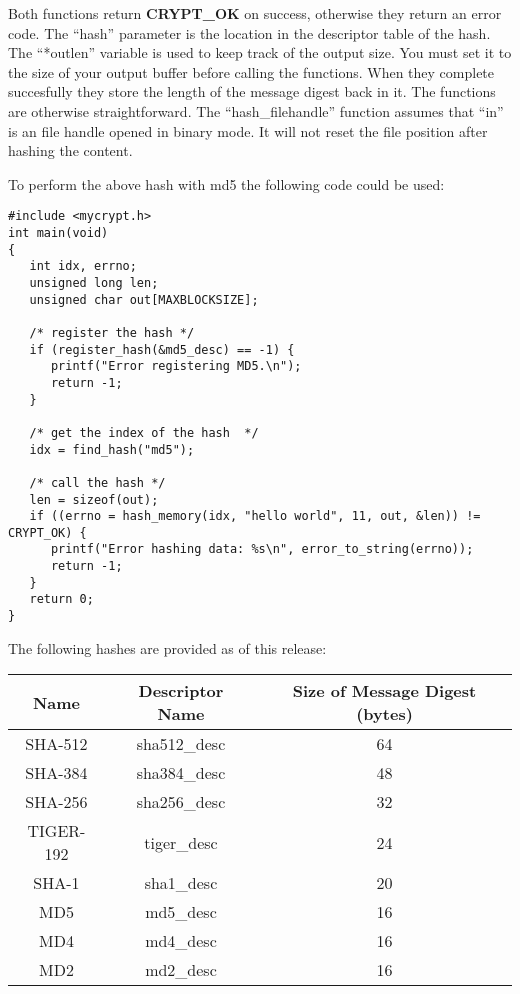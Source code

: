 \documentclass{book}
\begin{document}
Both functions return {\bf CRYPT\_OK} on success, otherwise they return an error code.  The ``hash'' parameter is
the location in the descriptor table of the hash.  The ``*outlen'' variable is used to keep track of the output size.  You
must set it to the size of your output buffer before calling the functions.  When they complete succesfully they store
the length of the message digest back in it.  The functions are otherwise straightforward.  The ``hash\_filehandle'' function
assumes that ``in'' is an file handle opened in binary mode.  It will not reset the file position after hashing the content.

To perform the above hash with md5 the following code could be used:
\begin{small}
\begin{verbatim}
#include <mycrypt.h>
int main(void)
{
   int idx, errno;
   unsigned long len;
   unsigned char out[MAXBLOCKSIZE];

   /* register the hash */
   if (register_hash(&md5_desc) == -1) {
      printf("Error registering MD5.\n");
      return -1;
   }

   /* get the index of the hash  */
   idx = find_hash("md5");

   /* call the hash */
   len = sizeof(out);
   if ((errno = hash_memory(idx, "hello world", 11, out, &len)) != CRYPT_OK) {
      printf("Error hashing data: %s\n", error_to_string(errno));
      return -1;
   }
   return 0;
}
\end{verbatim}
\end{small}

The following hashes are provided as of this release:
\begin{center}
\begin{tabular}{|c|c|c|}
      \hline Name & Descriptor Name & Size of Message Digest (bytes) \\
      \hline SHA-512 & sha512\_desc & 64 \\
      \hline SHA-384 & sha384\_desc & 48 \\
      \hline SHA-256 & sha256\_desc & 32 \\
      \hline TIGER-192 & tiger\_desc & 24 \\
      \hline SHA-1 & sha1\_desc & 20 \\
      \hline MD5 & md5\_desc & 16 \\
      \hline MD4 & md4\_desc & 16 \\
      \hline MD2 & md2\_desc & 16 \\
      \hline
\end{tabular}
\end{center}
\end{document}
